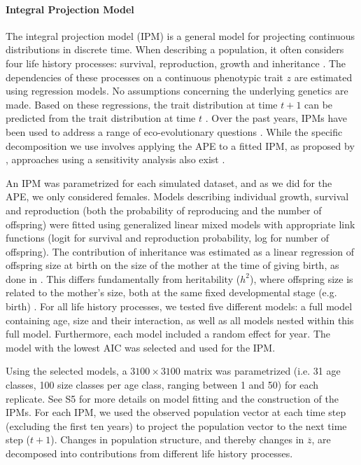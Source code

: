 \paragraph{Integral Projection Model}
The integral projection model (IPM) is a general model for projecting continuous distributions in discrete time. When describing a population, it often considers four life history processes: survival, reproduction, growth and inheritance \parencite{Ellner2006}. The dependencies of these processes on a continuous phenotypic trait $z$ are estimated using regression models. No assumptions concerning the underlying genetics are made. Based on these regressions, the trait distribution at time $t+1$ can be predicted from the trait distribution at time $t$ \parencite[as well as demographic properties, such as population growth rates, e.g.][]{Adler2010,merow2014}.  Over the past years, IPMs have been used to address a range of eco-evolutionary questions \parencite[e.g.][]{metcalf2008evolution,Smallegange2013,traill2014demography}. While the specific decomposition we use involves applying the APE to a fitted IPM, as proposed by \cite{Coulson2010}, approaches using a sensitivity analysis also exist \parencite[e.g.][]{Coulson2011modeling,traill2014demography}.

An IPM was parametrized for each simulated dataset, and as we did for the APE, we only considered females. Models describing individual growth, survival and reproduction (both the probability of reproducing and the number of offspring) were fitted using generalized linear mixed models with appropriate link functions (logit for survival and reproduction probability, log for number of offspring). The contribution of inheritance was estimated as a linear regression of offspring size at birth on the size of the mother at the time of giving birth, as done in \cite{traill2014demography}. This differs fundamentally from heritability ($h^2$), where offspring size is related to the mother's size, both at the same fixed developmental stage (e.g. birth) \parencite{Chevin2015a}. For all life history processes, we tested five different models: a full model containing age, size and their interaction, as well as all models nested within this full model. Furthermore, each model included a random effect for year. The model with the lowest AIC was selected and used for the IPM.

Using the selected models, a $3100\times3100$ matrix was parametrized (i.e. 31 age classes, 100 size classes per age class, ranging between 1 and 50) for each replicate. See S5 for more details on model fitting and the construction of the IPMs. For each IPM, we used the observed population vector at each time step (excluding the first ten years) to project the population vector to the next time step ($t+1$). Changes in population structure, and thereby changes in $\overline z$, are decomposed into contributions from different life history processes. 

